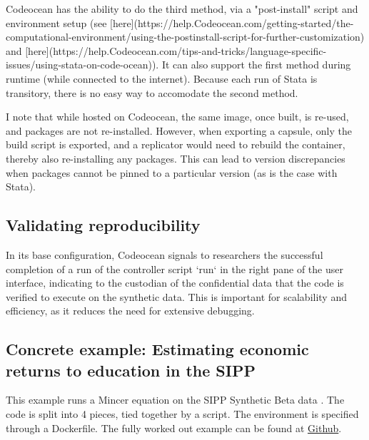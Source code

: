 \documentclass[]{hdsr}
\begin{document}
Codeocean has the ability to do the third method, via a "post-install" script and environment setup (see [here](https://help.Codeocean.com/getting-started/the-computational-environment/using-the-postinstall-script-for-further-customization) and [here](https://help.Codeocean.com/tips-and-tricks/language-specific-issues/using-stata-on-code-ocean)). It can also support the first method during runtime (while connected to the internet). Because each run of Stata is transitory, there is no easy way to accomodate the second method. 

I note that while hosted on Codeocean, the same image, once built, is re-used, and packages are not re-installed. However, when exporting a capsule, only the build script is exported, and a replicator would need to rebuild the container, thereby also re-installing any packages. This can lead to version discrepancies when packages cannot be pinned to a particular version (as is the case with Stata). 

\subsection{Validating reproducibility}

In its base configuration, Codeocean signals to researchers the successful completion of a run of the controller script `run` in the right pane of the user interface, indicating to the custodian of the confidential data that the code is verified to execute on the synthetic data. This is important for scalability and efficiency, as it reduces the need for extensive debugging.

\subsection{Concrete example: Estimating economic returns to education in the SIPP}

This example runs a Mincer equation on the SIPP Synthetic Beta data \citep{u.s.censusbureauSIPPSyntheticBeta2015b}. The code is split into 4 pieces, tied together by a script. The environment is specified through a Dockerfile. The fully worked out example can be found at \href{https://github.com/larsvilhuber/ssb-demo/releases/tag/v20250403}{Github}.


\end{document}
